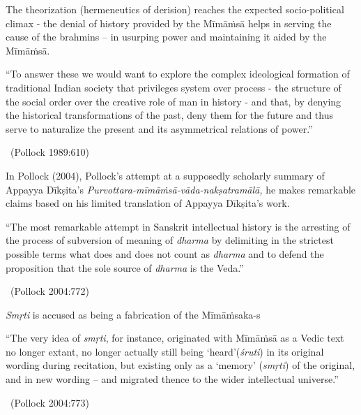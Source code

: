 The theorization (hermeneutics of derision) reaches the expected socio-political climax - the denial of history provided by the Mīmāṁsā helps in serving the cause of the brahmins – in usurping power and maintaining it aided by the Mīmāṁsā.

\smallskip

\begin{myquote}
“To answer these we would want to explore the complex ideological formation of traditional Indian society that privileges system over process - the structure of the social order over the creative role of man in history - and that, by denying the historical transformations of the past, deny them for the future and thus serve to naturalize the present and its asymmetrical relations of power.”

~\hfill (Pollock 1989:610)
\end{myquote}

\smallskip

In Pollock (2004), Pollock’s attempt at a supposedly scholarly summary of Appayya Dīkṣita’s \textit{Purvottara-mīmāṁsā-vāda-nakṣatramālā,} he makes remarkable claims based on his limited translation of Appayya Dīkṣita’s work.

\newpage

\begin{myquote}
“The most remarkable attempt in Sanskrit intellectual history is the arresting of the process of subversion of meaning of \textit{dharma} by delimiting in the strictest possible terms what does and does not count as \textit{dharma} and to defend the proposition that the sole source of \textit{dharma} is the Veda.”

~\hfill (Pollock 2004:772)
\end{myquote}

\textit{Smṛti} is accused as being a fabrication of the Mīmāṁsaka-s

\begin{myquote}
“The very idea of \textit{smṛti}, for instance, originated with Mīmāṁsā as a Vedic text no longer extant, no longer actually still being ‘heard’(\textit{śruti}) in its original wording during recitation, but existing only as a ‘memory’ (\textit{smṛti}) of the original, and in new wording – and migrated thence to the wider intellectual universe.”

~\hfill (Pollock 2004:773)
\end{myquote}

